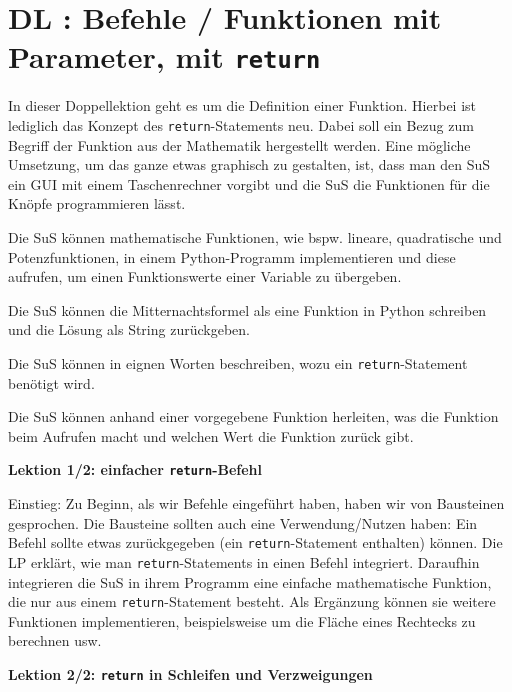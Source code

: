 \section{DL \themycounter: Befehle / Funktionen mit Parameter, mit \texorpdfstring{\lstinline|return|}{return}}
\begin{myExBox}[title=DL \themycounter]
In dieser Doppellektion geht es um die Definition einer Funktion. Hierbei ist lediglich das Konzept des \lstinline|return|-Statements neu. Dabei soll ein Bezug zum Begriff der Funktion aus der Mathematik hergestellt werden. Eine mögliche Umsetzung, um das ganze etwas graphisch zu gestalten, ist, dass man den SuS ein GUI mit einem Taschenrechner vorgibt und die SuS die Funktionen für die Knöpfe programmieren lässt.

\begin{todolist}
    \item Die SuS können mathematische Funktionen, wie bspw. lineare, quadratische und Potenzfunktionen, in einem Python-Programm implementieren und diese aufrufen, um einen Funktionswerte einer Variable zu übergeben.
    \item Die SuS können die Mitternachtsformel als eine Funktion in Python schreiben und die Lösung als String zurückgeben.
    \item Die SuS können in eignen Worten beschreiben, wozu ein \lstinline|return|-Statement benötigt wird.
    \item Die SuS können anhand einer vorgegebene Funktion herleiten, was die Funktion beim Aufrufen macht und welchen Wert die Funktion zurück gibt.
\end{todolist}

\textbf{Lektion 1/2: einfacher \lstinline|return|-Befehl}

Einstieg: Zu Beginn, als wir Befehle eingeführt haben, haben wir von Bausteinen gesprochen. Die Bausteine sollten auch eine Verwendung/Nutzen haben: Ein Befehl sollte etwas zurückgegeben (ein \lstinline|return|-Statement enthalten) können. Die LP erklärt, wie man \lstinline|return|-Statements in einen Befehl integriert. Daraufhin integrieren die SuS in ihrem Programm eine einfache mathematische Funktion, die nur aus einem \lstinline|return|-Statement besteht. Als Ergänzung können sie weitere Funktionen implementieren, beispielsweise um die Fläche eines Rechtecks zu berechnen usw. 

\textbf{Lektion 2/2: \lstinline|return| in Schleifen und Verzweigungen}


\end{myExBox}

